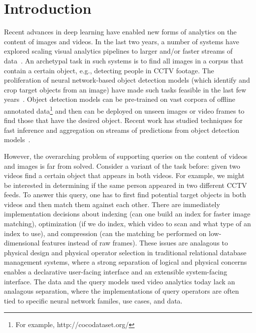 \section{Introduction}\label{intro}\sloppy
 Recent advances in deep learning have enabled new forms of analytics on the content of images and videos.
In the last two years, a number of systems have explored scaling visual analytics pipelines to larger and/or faster streams of data~\cite{anderson2018predicate, kang2018blazeit,kang2017noscope, wu2018querying, sparks2017keystoneml,haynes2018lightdb}.
An archetypal task in such systems is to find all images in a corpus that contain a certain object, e.g., detecting people in CCTV footage.
The proliferation of neural network-based object detection models (which identify and crop target objects from an image) have made such tasks feasible in the last few years~\cite{he2017mask}.
Object detection models can be pre-trained on vast corpora of offline annotated data\footnote{For example, http://cocodataset.org/} and then can be deployed on unseen images or video frames to find those that have the desired object.
Recent work has studied techniques for fast inference and aggregation on streams of predictions from object detection models~\cite{kang2018blazeit,kang2017noscope}.


However, the overarching problem of supporting queries on the content of videos and images is far from solved.
Consider a variant of the task before: given two videos find a certain object that appears in both videos.
For example, we might be interested in determining if the same person appeared in two different CCTV feeds.
To answer this query, one has to first find potential target objects in both videos and then match them against each other.
There are immediately implementation decisions about indexing (can one build an index for faster image matching), optimization (if we do index, which video to scan and what type of an index to use), and compression (can the matching be performed on low-dimensional features instead of raw frames). 
These issues are analagous to physical design and physical operator selection in traditional relational database management systems, where a strong separation of logical and physical concerns enables a declarative user-facing interface and an extensible system-facing interface.
The data and the query models used video analytics today lack an analagous separation, where the implementations of query operators are often tied to specific neural network familes, use cases, and data.

